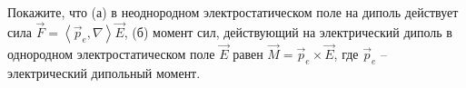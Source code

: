 \documentclass[__main__.tex]{subfiles}
\begin{document}
Покажите, что (а) в неоднородном электростатическом поле на диполь действует сила $\vec{F}=\left<\vec{p}_e,\nabla\right>\vec{E}$, (б) момент сил, действующий на электрический диполь в однородном электростатическом поле $\vec{E}$ равен $\vec{M}=\vec{p}_e\times\vec{E}$, где $\vec{p}_e$ -- электрический дипольный момент.\\ 

\end{document}
